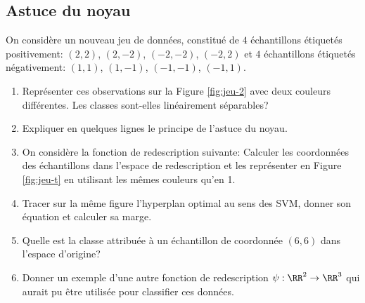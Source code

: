 \documentclass[11pt]{article}
\begin{document}
\subsection{Astuce du noyau}
On considère un nouveau jeu de données, constitué de $4$ échantillons étiquetés positivement: $(2,2)$, $(2,-2)$, $(-2,-2)$, $(-2,2)$ et $4$ échantillons étiquetés négativement: $(1,1)$, $(1,-1)$, $(-1,-1)$, $(-1,1)$.

\begin{enumerate}
	\item Représenter ces observations sur la Figure \ref{fig:jeu-2} avec deux couleurs différentes. Les classes sont-elles linéairement séparables?
	
	\item Expliquer en quelques lignes le principe de l'astuce du noyau.
	
	\item On considère la fonction de redescription suivante:
	Calculer les coordonnées des échantillons dans l'espace de redescription et les représenter en Figure \ref{fig:jeu-t} en utilisant les mêmes couleurs qu'en 1.
	
	\item Tracer sur la même figure l'hyperplan optimal au sens des SVM, donner son équation et calculer sa marge.
	
	\item Quelle est la classe attribuée à un échantillon de coordonnée $(6,6)$ dans l'espace d'origine?
	
	\item Donner un exemple d'une autre fonction de redescription $\psi : \RR^2 \to \RR^3$ qui aurait pu être utilisée pour classifier ces données.
\end{enumerate}
\end{document}
